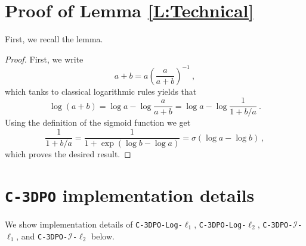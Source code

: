 \section{Proof of Lemma \ref{L:Technical}} \label{Appendix:Lemma}
    First, we recall the lemma.
    \technical*
    \begin{proof}
        First, we write
        \begin{equation*}
            a + b = a\left(\frac{a}{a + b}\right)^{-1}\ ,
        \end{equation*}
        which tanks to classical logarithmic rules yields that
        \begin{equation*}
            \log(a + b) = \log a - \log \frac{a}{a + b} = \log a - \log \frac{1}{1 + b/a}\ .
        \end{equation*}
        Using the definition of the sigmoid function we get
        \begin{equation*}
            \frac{1}{1 + b/a} = \frac{1}{1 + \exp(\log b - \log a)}= \sigma(\log a - \log b)\ ,
        \end{equation*}
        which proves the desired result.
    \end{proof}

\section{\texttt{C-3DPO} implementation details} \label{Appendix:c-3dpo_pseudo_code}
    We show implementation details of \texttt{C-3DPO-Log-$\ell_1$}, \texttt{C-3DPO-Log-$\ell_2$}, \texttt{C-3DPO-$\mathcal{I}$-$\ell_1$}, and \texttt{C-3DPO-$\mathcal{I}$-$\ell_2$} below. 

